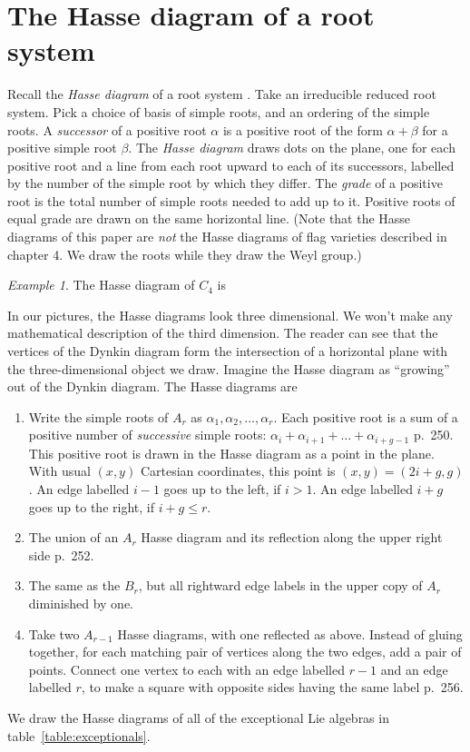\documentclass[a4paper,10pt]{amsart}
\theoremstyle{remark}
\newtheorem{example}{Example}
\begin{document}
\section{The Hasse diagram of a root system}
Recall the \emph{Hasse diagram} of a root system \cite{Ringel2013}.
Take an irreducible reduced root system.
Pick a choice of basis of simple roots, and an ordering of the simple roots. 
A \emph{successor} of a positive root \(\alpha\) is a positive root of the form \(\alpha+\beta\) for a positive simple root \(\beta\).
The \emph{Hasse diagram} draws dots on the plane, one for each positive root and a line from each root upward to each of its successors, labelled by the number of the simple root by which they differ.
The \emph{grade} of a positive root is the total number of simple roots needed to add up to it.
Positive roots of equal grade are drawn on the same horizontal line.
(Note that the Hasse diagrams of this paper are \emph{not} the Hasse diagrams of flag varieties described in \cite{Baston/Eastwood:1989} chapter 4.
We draw the roots while they draw the Weyl group.)
\begin{example}
The Hasse diagram of \(C_4\) is
\tikzset{/Lie Hasse diagram,attach Dynkin diagram=true,three D=true}
\end{example}
In our pictures, the Hasse diagrams look three dimensional.
We won't make any mathematical description of the third dimension.
The reader can see that the vertices of the Dynkin diagram form the intersection of a horizontal plane with the three-dimensional object we draw.
Imagine the Hasse diagram as ``growing'' out of the Dynkin diagram.
The Hasse diagrams are
\begin{enumerate}
\item[\(A_r\)] Write the simple roots of \(A_r\) as \(\alpha_1,\alpha_2,\dots,\alpha_r\).
Each positive root is a sum of a positive number of \emph{successive} simple roots: \(\alpha_i+\alpha_{i+1}+\dots+\alpha_{i+g-1}\) \cite{Bourbaki:2002} p.~250.
This positive root is drawn in the Hasse diagram as a point in the plane.
With usual \((x,y)\) Cartesian coordinates, this point is \((x,y)=(2i+g,g)\). 
An edge labelled \(i-1\) goes up to the left, if \(i>1\).
An edge labelled \(i+g\) goes up to the right, if \(i+g\le r\).
\item[\(B_r\)] The union of an \(A_r\) Hasse diagram and its reflection along the upper right side  \cite{Bourbaki:2002} p.~252.
\item[\(C_r\)] The same as the \(B_r\), but all rightward edge labels in the upper copy of \(A_r\) diminished by one.
\item[\(D_r\)] 
Take two \(A_{r-1}\) Hasse diagrams, with one reflected as above.
Instead of gluing together, for each matching pair of vertices along the two edges, add a pair of points.
Connect one vertex to each with an edge labelled \(r-1\) and an edge labelled \(r\), to make a square with opposite sides having the same label \cite{Bourbaki:2002} p.~256.
\end{enumerate}
We draw the Hasse diagrams of all of the exceptional Lie algebras in table~\vref{table:exceptionals}.
\end{document}
